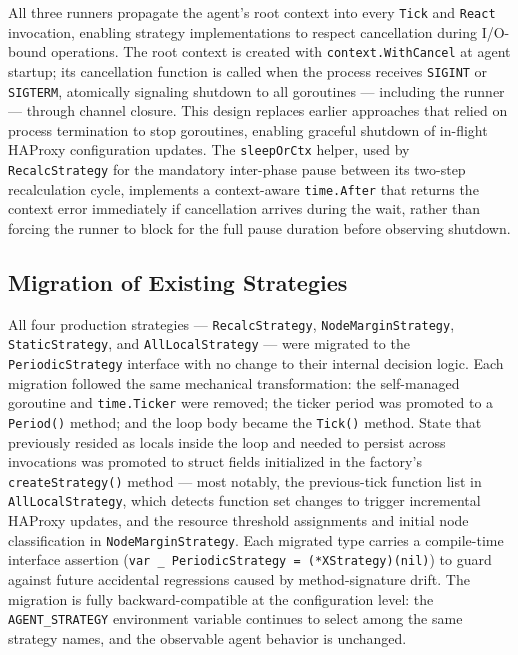 All three runners propagate the agent's root context into every \texttt{Tick}
and \texttt{React} invocation, enabling strategy implementations to respect
cancellation during \ac{I/O}-bound operations.
The root context is created with \texttt{context.WithCancel} at agent startup;
its cancellation function is called when the process receives \texttt{SIGINT} or
\texttt{SIGTERM}, atomically signaling shutdown to all goroutines — including the
runner — through channel closure.
This design replaces earlier approaches that relied on process termination to
stop goroutines, enabling graceful shutdown of in-flight \ac{HAProxy}
configuration updates.
The \texttt{sleepOrCtx} helper, used by \texttt{RecalcStrategy} for the
mandatory inter-phase pause between its two-step recalculation cycle, implements
a context-aware \texttt{time.After} that returns the context error immediately if
cancellation arrives during the wait, rather than forcing the runner to block for
the full pause duration before observing shutdown.

\subsection{Migration of Existing Strategies}
\label{subsec:migration}

All four production strategies — \texttt{RecalcStrategy},
\texttt{NodeMarginStrategy}, \texttt{StaticStrategy}, and
\texttt{AllLocalStrategy} — were migrated to the \texttt{PeriodicStrategy}
interface with no change to their internal decision logic.
Each migration followed the same mechanical transformation: the self-managed
goroutine and \texttt{time.Ticker} were removed; the ticker period was promoted
to a \texttt{Period()} method; and the loop body became the \texttt{Tick()}
method.
State that previously resided as locals inside the loop and needed to persist
across invocations was promoted to struct fields initialized in the factory's
\texttt{createStrategy()} method — most notably, the previous-tick function list
in \texttt{AllLocalStrategy}, which detects function set changes to trigger
incremental \ac{HAProxy} updates, and the resource threshold assignments and
initial node classification in \texttt{NodeMarginStrategy}.
Each migrated type carries a compile-time interface assertion
(\texttt{var~\_~PeriodicStrategy~=~(*XStrategy)(nil)}) to guard against future
accidental regressions caused by method-signature drift.
The migration is fully backward-compatible at the configuration level: the
\texttt{AGENT\_STRATEGY} environment variable continues to select among the same
strategy names, and the observable agent behavior is unchanged.
